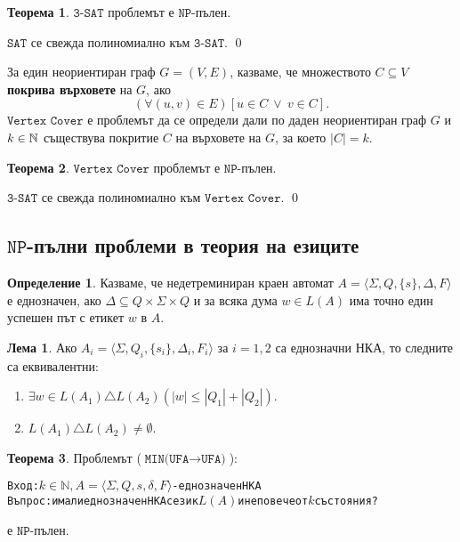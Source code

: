 \documentclass[a4paper]{article}
\theoremstyle{definition}
\newtheorem{theorem}{Теорема}
\newtheorem{lemma}{Лема}
\newtheorem{definition}{Определение}
\newenvironment{hint}{\noindent{\bf Упътване.}\hspace*{1em}}{\qed\par\vspace*{1em}}
\begin{document}
\begin{theorem}
  $\texttt{3-SAT}$ проблемът е $\texttt{NP}$-пълен.
\end{theorem}
\begin{hint}
  $\texttt{SAT}$ се свежда полиномиално към $\texttt{3-SAT}$.
\end{hint}

За един неориентиран граф $G = (V,E)$,
казваме, че множеството $C \subseteq V$ {\bf покрива върховете} на $G$, ако
\[(\forall (u,v) \in E)[u \in C\ \lor\ v \in C].\]
$\texttt{Vertex Cover}$ е проблемът да се определи дали по даден неориентиран граф $G$ и $k \in \mathbb{N}$
съществува покритие $C$ на върховете на $G$, за което $|C| = k$.

\begin{theorem}
  $\texttt{Vertex Cover}$ проблемът е $\texttt{NP}$-пълен.
\end{theorem}
\begin{hint}
  $\texttt{3-SAT}$ се свежда полиномиално към $\texttt{Vertex Cover}$.
\end{hint}


\subsection*{$\texttt{NP}$-пълни проблеми в теория на езиците}

\begin{definition}
Казваме, че недетреминиран краен автомат $A=\langle \Sigma,Q,\{s\},\Delta,F\rangle$ е еднозначен,
ако $\Delta\subseteq Q\times \Sigma\times Q$ и за всяка дума $w\in L(A)$ има точно един успешен път с етикет $w$ в $A$.
\end{definition}

\begin{lemma}
  Ако $A_i=\langle \Sigma,Q_i,\{s_i\},\Delta_i,F_i\rangle$ за $i=1,2$ са еднозначни НКА, то следните са еквивалентни:
  \begin{enumerate}
  \item $\exists w\in L(A_1)\triangle L(A_2) (|w|\le |Q_1|+|Q_2|)$.
  \item $L(A_1)\triangle L(A_2)\neq\emptyset$.
  \end{enumerate} 
\end{lemma}

\begin{theorem}
Проблемът ($\texttt{MIN(UFA}\rightarrow\texttt{UFA)}$):
\begin{alltt}
Вход: \(k\in\mathbb{N}, A=\langle\Sigma,Q,s,\delta,F\rangle\) - еднозначен НКА
Въпрос: има ли еднозначен НКА с език \(L(A)\) и не повече от \(k\) състояния?
\end{alltt}
е $\texttt{NP}$-пълен.
\end{theorem}
\end{document}
